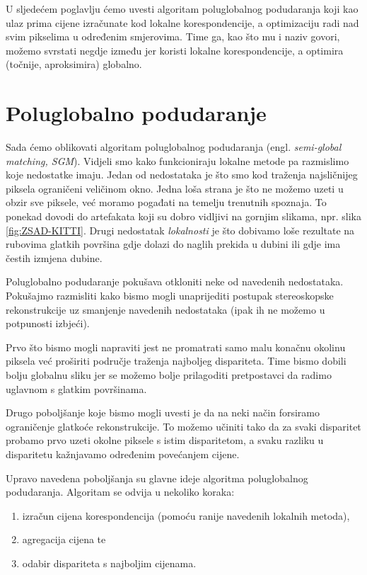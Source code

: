 \documentclass[utf8, zavrsni, numeric]{fer}
\begin{document}
U sljedećem poglavlju ćemo uvesti algoritam poluglobalnog podudaranja koji kao ulaz prima cijene izračunate kod lokalne korespondencije, a optimizaciju radi nad svim
pikselima u određenim smjerovima. Time ga, kao što mu i naziv govori, možemo svrstati negdje između jer koristi lokalne korespondencije, a optimira (točnije, aproksimira) globalno.


\chapter{Poluglobalno podudaranje}

Sada ćemo oblikovati algoritam poluglobalnog podudaranja (engl. {\sl semi-global matching, SGM}).
Vidjeli smo kako funkcioniraju lokalne metode pa razmislimo koje nedostatke imaju. Jedan od nedostataka je što
smo kod traženja najsličnijeg piksela ograničeni veličinom okno. Jedna loša strana je što ne možemo uzeti u obzir sve piksele, već moramo pogađati na temelju trenutnih spoznaja.
To ponekad dovodi do artefakata koji su dobro vidljivi na gornjim slikama, npr. slika \ref{fig:ZSAD-KITTI}.
Drugi nedostatak {\sl lokalnosti} je što dobivamo loše rezultate na rubovima glatkih površina
gdje dolazi do naglih prekida u dubini ili gdje ima čestih izmjena dubine.

Poluglobalno podudaranje pokušava otkloniti neke od navedenih nedostataka. Pokušajmo razmisliti kako bismo mogli unaprijediti postupak stereoskopske rekonstrukcije uz smanjenje navedenih nedostataka (ipak ih ne možemo u potpunosti izbjeći).

Prvo što bismo mogli napraviti jest ne promatrati samo malu konačnu okolinu piksela već proširiti područje traženja najboljeg dispariteta. Time bismo dobili bolju globalnu sliku jer se možemo bolje prilagoditi pretpostavci da radimo uglavnom s glatkim površinama.

Drugo poboljšanje koje bismo mogli uvesti je da na neki način forsiramo ograničenje glatkoće rekonstrukcije.
To možemo učiniti tako da za svaki disparitet probamo prvo uzeti okolne piksele s istim disparitetom, a svaku razliku u disparitetu kažnjavamo određenim povećanjem cijene.

Upravo navedena poboljšanja su glavne ideje algoritma poluglobalnog podudaranja. Algoritam se odvija u nekoliko koraka:
\begin{enumerate}
  \item izračun cijena korespondencija (pomoću ranije navedenih lokalnih metoda),
  \item agregacija cijena te
  \item odabir dispariteta s najboljim cijenama.
\end{enumerate}
\end{document}
